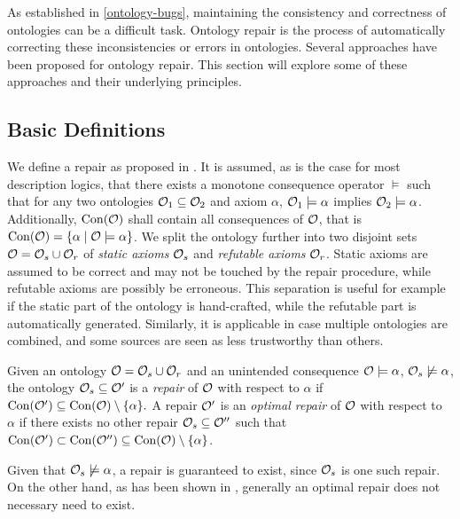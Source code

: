
As established in \cref{ontology-bugs}, maintaining the consistency and correctness of ontologies can be a difficult task. Ontology repair is the process of automatically correcting these inconsistencies or errors in ontologies. Several approaches have been proposed for ontology repair. This section will explore some of these approaches and their underlying principles.

\subsection{Basic Definitions} \label{basic-definitions}

We define a repair as proposed in \cite{baader2018making}. It is assumed, as is the case for most description logics, that there exists a monotone consequence operator $\models$ such that for any two ontologies $\mathcal{O}_1 \subseteq \mathcal{O}_2$ and axiom $\alpha$, $\mathcal{O}_1 \models \alpha$ implies $\mathcal{O}_2 \models \alpha$. Additionally, $\mathrm{Con}(\mathcal{O})$ shall contain all consequences of $\mathcal{O}$, that is $\mathrm{Con}(\mathcal{O}) = \{ \alpha \mid \mathcal{O} \models \alpha \}$. We split the ontology further into two disjoint sets $\mathcal{O} = \mathcal{O}_s \cup \mathcal{O}_r$ of \emph{static axioms} $\mathcal{O}_s$ and \emph{refutable axioms} $\mathcal{O}_r$. Static axioms are assumed to be correct and may not be touched by the repair procedure, while refutable axioms are possibly be erroneous. This separation is useful for example if the static part of the ontology is hand-crafted, while the refutable part is automatically generated. Similarly, it is applicable in case multiple ontologies are combined, and some sources are seen as less trustworthy than others.

\begin{definition}
Given an ontology $\mathcal{O} = \mathcal{O}_s \cup \mathcal{O}_r$ and an unintended consequence $\mathcal{O} \models \alpha$, $\mathcal{O}_s \not\models \alpha$, the ontology $\mathcal{O}_s \subseteq \mathcal{O}'$ is a \emph{repair} of $\mathcal{O}$ with respect to $\alpha$ if $\mathrm{Con}(\mathcal{O}') \subseteq \mathrm{Con}(\mathcal{O}) \setminus \{\alpha\}.$ A repair $\mathcal{O}'$ is an \emph{optimal repair} of $\mathcal{O}$ with respect to $\alpha$ if there exists no other repair $\mathcal{O}_s \subseteq \mathcal{O}''$ such that $\mathrm{Con}(\mathcal{O}') \subset \mathrm{Con}(\mathcal{O}'') \subseteq \mathrm{Con}(\mathcal{O}) \setminus \{\alpha\}$.
\end{definition}

Given that $\mathcal{O}_s \not\models \alpha$, a repair is guaranteed to exist, since $\mathcal{O}_s$ is one such repair. On the other hand, as has been shown in \cite{baader2018making}, generally an optimal repair does not necessary need to exist.

